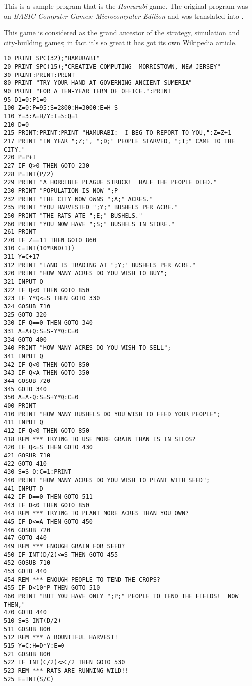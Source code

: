 This is a sample program that is the \emph{Hamurabi} game. The original program was on \emph{BASIC Computer Games: Microcomputer Edition} and was translated into \tbas.

This game is considered as the grand ancestor of the strategy, simulation and city-building games; in fact it's so great it has got its own Wikipedia article.

\begin{lstlisting}
10 PRINT SPC(32);"HAMURABI"
20 PRINT SPC(15);"CREATIVE COMPUTING  MORRISTOWN, NEW JERSEY"
30 PRINT:PRINT:PRINT
80 PRINT "TRY YOUR HAND AT GOVERNING ANCIENT SUMERIA"
90 PRINT "FOR A TEN-YEAR TERM OF OFFICE.":PRINT
95 D1=0:P1=0
100 Z=0:P=95:S=2800:H=3000:E=H-S
110 Y=3:A=H/Y:I=5:Q=1
210 D=0
215 PRINT:PRINT:PRINT "HAMURABI:  I BEG TO REPORT TO YOU,":Z=Z+1
217 PRINT "IN YEAR ";Z;", ";D;" PEOPLE STARVED, ";I;" CAME TO THE CITY,"
220 P=P+I
227 IF Q>0 THEN GOTO 230
228 P=INT(P/2)
229 PRINT "A HORRIBLE PLAGUE STRUCK!  HALF THE PEOPLE DIED."
230 PRINT "POPULATION IS NOW ";P
232 PRINT "THE CITY NOW OWNS ";A;" ACRES."
235 PRINT "YOU HARVESTED ";Y;" BUSHELS PER ACRE."
250 PRINT "THE RATS ATE ";E;" BUSHELS."
260 PRINT "YOU NOW HAVE ";S;" BUSHELS IN STORE."
261 PRINT
270 IF Z==11 THEN GOTO 860
310 C=INT(10*RND(1))
311 Y=C+17
312 PRINT "LAND IS TRADING AT ";Y;" BUSHELS PER ACRE."
320 PRINT "HOW MANY ACRES DO YOU WISH TO BUY";
321 INPUT Q
322 IF Q<0 THEN GOTO 850
323 IF Y*Q<=S THEN GOTO 330
324 GOSUB 710
325 GOTO 320
330 IF Q==0 THEN GOTO 340
331 A=A+Q:S=S-Y*Q:C=0
334 GOTO 400
340 PRINT "HOW MANY ACRES DO YOU WISH TO SELL";
341 INPUT Q
342 IF Q<0 THEN GOTO 850
343 IF Q<A THEN GOTO 350
344 GOSUB 720
345 GOTO 340
350 A=A-Q:S=S+Y*Q:C=0
400 PRINT
410 PRINT "HOW MANY BUSHELS DO YOU WISH TO FEED YOUR PEOPLE";
411 INPUT Q
412 IF Q<0 THEN GOTO 850
418 REM *** TRYING TO USE MORE GRAIN THAN IS IN SILOS?
420 IF Q<=S THEN GOTO 430
421 GOSUB 710
422 GOTO 410
430 S=S-Q:C=1:PRINT
440 PRINT "HOW MANY ACRES DO YOU WISH TO PLANT WITH SEED";
441 INPUT D
442 IF D==0 THEN GOTO 511
443 IF D<0 THEN GOTO 850
444 REM *** TRYING TO PLANT MORE ACRES THAN YOU OWN?
445 IF D<=A THEN GOTO 450
446 GOSUB 720
447 GOTO 440
449 REM *** ENOUGH GRAIN FOR SEED?
450 IF INT(D/2)<=S THEN GOTO 455
452 GOSUB 710
453 GOTO 440
454 REM *** ENOUGH PEOPLE TO TEND THE CROPS?
455 IF D<10*P THEN GOTO 510
460 PRINT "BUT YOU HAVE ONLY ";P;" PEOPLE TO TEND THE FIELDS!  NOW THEN,"
470 GOTO 440
510 S=S-INT(D/2)
511 GOSUB 800
512 REM *** A BOUNTIFUL HARVEST!
515 Y=C:H=D*Y:E=0
521 GOSUB 800
522 IF INT(C/2)<>C/2 THEN GOTO 530
523 REM *** RATS ARE RUNNING WILD!!
525 E=INT(S/C)

\end{lstlisting}
